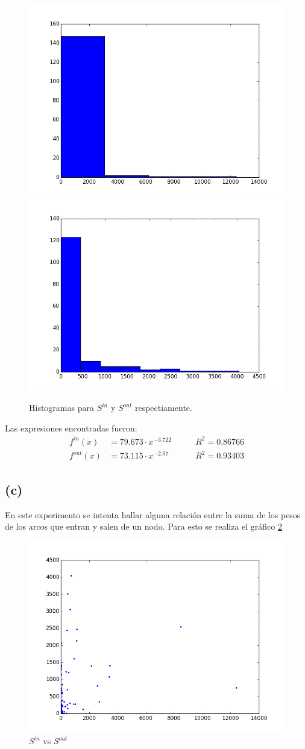 \documentclass[letterpaper]{article}
\begin{document}
\begin{figure}[H]
  \centering
  \includegraphics[width=.49\linewidth]{img/p9-s-in.png}\hfill
  \includegraphics[width=.49\linewidth]{img/p9-s-out.png}\hfill
  \caption{Histogramas para $S^{in}$ y $S^{out}$ respectiamente.}
  \label{chart:1}
\end{figure}
Las expresiones encontradas fueron:
\begin{align}
  f^{in}(x)  &= 79.673\cdot x^{-3.722} & \qquad R^2 = 0.86766 \\
  f^{out}(x) &= 73.115\cdot x^{-2.07}  & \qquad R^2 = 0.93403
\end{align}

\subsection*{(c)}
En este experimento se intenta hallar alguna relación entre la suma de los pesos de los arcos que entran y salen de un nodo. Para esto se realiza el gráfico \ref{chart:2}
\begin{figure}[H]
  \centering
  \includegraphics[width=.75\linewidth]{img/p9-s-s.png}\hfill
  \caption{$S^{in}$ vs $S^{out}$}
  \label{chart:2}
\end{figure}
\end{document}
